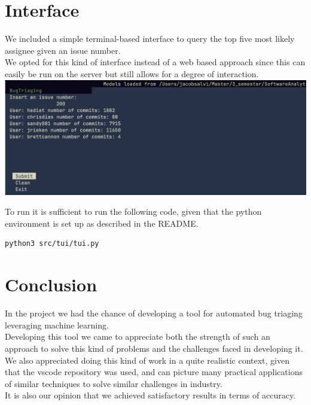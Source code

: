 \documentclass[tikz,10pt,fleqn]{article}
\begin{document}
\section*{Interface}
We included a simple terminal-based interface to query the top five most likely assignee given an issue number.\\
We opted for this kind of interface instead of a web based approach since this can easily be run on the server but still allows for a degree of interaction.
\includegraphics[width=\textwidth]{./tui.png}

To run it is sufficient to run the following code, given that the python environment is set up as described in the README.
\begin{verbatim}
python3 src/tui/tui.py
\end{verbatim}

\section*{Conclusion}
In the project we had the chance of developing a tool for automated bug triaging leveraging machine learning.\\
Developing this tool we came to appreciate both the strength of such an approach to solve this kind of problems and the challenges faced in developing it.\\
We also appreciated doing this kind of work in a quite realistic context, given that the vscode repository was used, and can picture many practical applications of similar techniques to solve similar challenges in industry.\\
It is also our opinion that we achieved satisfactory results in terms of accuracy.
\end{document}
